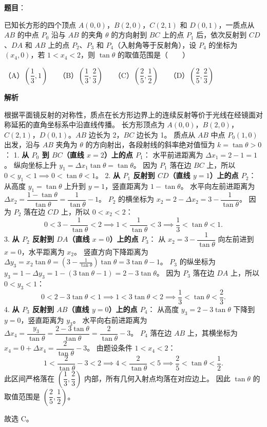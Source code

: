 \begin{answer}

\textbf{题目}：

已知长方形的四个顶点 $A(0, 0)$，$B(2, 0)$，$C(2, 1)$ 和 $D(0, 1)$，一质点从 $AB$ 的中点 $P_0$ 沿与 $AB$ 的夹角 $\theta$ 的方向射到 $BC$ 上的点 $P_1$ 后，依次反射到 $CD$、$DA$ 和 $AB$ 上的点 $P_2$、$P_3$ 和 $P_4$（入射角等于反射角），设 $P_4$ 的坐标为 $(x_4, 0)$，若 $1 < x_4 < 2$，则 $\tan\theta$ 的取值范围是\mbox{（　　）}

（A）$\left(\dfrac{1}{3}, 1\right)$　　（B）$\left(\dfrac{1}{3}, \dfrac{2}{3}\right)$　　（C）$\left(\dfrac{2}{5}, \dfrac{1}{2}\right)$　　（D）$\left(\dfrac{2}{5}, \dfrac{2}{3}\right)$

\textbf{解析}

根据平面镜反射的对称性，质点在长方形边界上的连续反射等价于光线在经镜面对称延拓的直角坐标系中沿直线传播。
长方形顶点为 $A(0, 0)$，$B(2, 0)$，$C(2, 1)$，$D(0, 1)$。$AB$ 边长为 2，$BC$ 边长为 1。
质点从 $AB$ 中点 $P_0(1, 0)$ 出发，沿与 $AB$ 夹角为 $\theta$ 的方向射出，各段射线的斜率绝对值恒为 $k = \tan\theta > 0$：
1. \textbf{从 $P_0$ 到 $BC$（直线 $x = 2$）上的点 $P_1$}：
   水平前进距离为 $\Delta x_1 = 2 - 1 = 1$。
   纵向坐标上升 $y_1 = \Delta x_1 \tan\theta = \tan\theta$。
   因为 $P_1$ 落在边 $BC$ 上，所以 $0 < y_1 < 1 \implies 0 < \tan\theta < 1$。
2. \textbf{从 $P_1$ 反射到 $CD$（直线 $y = 1$）上的点 $P_2$}：
   从高度 $y_1 = \tan\theta$ 上升到 $y = 1$，竖直距离为 $1 - \tan\theta$。
   水平向左前进距离为 $\Delta x_2 = \dfrac{1 - \tan\theta}{\tan\theta} = \dfrac{1}{\tan\theta} - 1$。
   $P_2$ 的横坐标为 $x_2 = 2 - \Delta x_2 = 3 - \dfrac{1}{\tan\theta}$。
   因为 $P_2$ 落在边 $CD$ 上，所以 $0 < x_2 < 2$：
\nopagebreak[4]
\[0 < 3 - \frac{1}{\tan\theta} < 2 \implies 1 < \frac{1}{\tan\theta} < 3 \implies \frac{1}{3} < \tan\theta < 1.\]
3. \textbf{从 $P_2$ 反射到 $DA$（直线 $x = 0$）上的点 $P_3$}：
   从 $x_2 = 3 - \dfrac{1}{\tan\theta}$ 向左前进到 $x = 0$，水平距离为 $x_2$。
   竖直方向下降距离为 $\Delta y_3 = x_2 \tan\theta = \left(3 - \frac{1}{\tan\theta}\right)\tan\theta = 3\tan\theta - 1$。
   $P_3$ 的纵坐标为 $y_3 = 1 - \Delta y_3 = 1 - (3\tan\theta - 1) = 2 - 3\tan\theta$。
   因为 $P_3$ 落在边 $DA$ 上，所以 $0 < y_3 < 1$：
\nopagebreak[4]
\[0 < 2 - 3\tan\theta < 1 \implies 1 < 3\tan\theta < 2 \implies \frac{1}{3} < \tan\theta < \frac{2}{3}.\]
4. \textbf{从 $P_3$ 反射到 $AB$（直线 $y = 0$）上的点 $P_4$}：
   从高度 $y_3 = 2 - 3\tan\theta$ 下降到 $y = 0$，竖直距离为 $y_3$。
   水平向右前进距离为 $\Delta x_4 = \dfrac{y_3}{\tan\theta} = \dfrac{2 - 3\tan\theta}{\tan\theta} = \dfrac{2}{\tan\theta} - 3$。
   $P_4$ 落在边 $AB$ 上，其横坐标为 $x_4 = 0 + \Delta x_4 = \dfrac{2}{\tan\theta} - 3$。
   由题设条件 $1 < x_4 < 2$：
\nopagebreak[4]
\[1 < \frac{2}{\tan\theta} - 3 < 2 \implies 4 < \frac{2}{\tan\theta} < 5 \implies \frac{2}{5} < \tan\theta < \frac{1}{2}.\]
此区间严格落在 $\left(\dfrac{1}{3}, \dfrac{2}{3}\right)$ 内部，所有几何入射点均落在对应边上。
因此 $\tan\theta$ 的取值范围是 $\left(\dfrac{2}{5}, \dfrac{1}{2}\right)$。

故选 C。


\end{answer}
